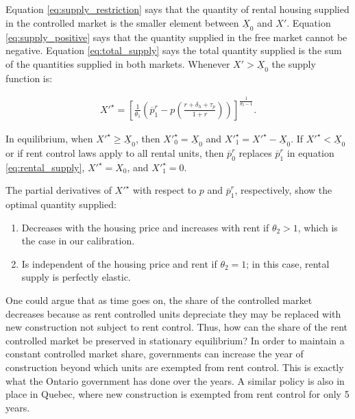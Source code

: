 \documentclass[parskip=full]{article}
\begin{document}
\noindent Equation \ref{eq:supply_restriction} says that the quantity of rental housing supplied in the controlled market is the smaller element between $\underline{X}_{0}$ and $X'$. Equation \ref{eq:supply_positive} says that the quantity supplied in the free market cannot be negative. Equation \ref{eq:total_supply} says the total quantity supplied is the sum of the quantities supplied in both markets. Whenever $X'>\underline{X}_{0}$ the supply function is:

\begin{align}\label{eq:rental_supply}
X'^{\star}=\left[\frac{1}{\theta_{1}}\left(\overline{p}^{r}_{1}-p\left(\frac{r+\delta_{h}+\tau_{p}}{1+r}\right)\right)\right]^{\frac{1}{\theta_{2}-1}}.
\end{align}

\noindent In equilibrium, when $X'^{\star}\geq \underline{X}_{0}$, then $X'^{\star}_{0}=\underline{X}_{0}$ and $X'^{\star}_{1}=X'^{\star}-\underline{X}_{0}$. If $X'^{\star}<\underline{X}_{0}$ or if rent control laws apply to all rental units, then $\overline{p}^{r}_{0}$ replaces $\overline{p}^{r}_{1}$ in equation \ref{eq:rental_supply}, $X'^{\star}=X_{0}$, and $X'^{\star}_{1}=0$. 

\noindent The partial derivatives of $X'^{\star}$ with respect to $p$ and $\overline{p}^{r}_{1}$, respectively, show the optimal quantity supplied:

\begin{enumerate}
    \item Decreases with the housing price and increases with rent if $\theta_{2}>1$, which is the case in our calibration.
    \item Is independent of the housing price and rent if $\theta_{2}=1$; in this case, rental supply is perfectly elastic.
\end{enumerate}

One could argue that as time goes on, the share of the controlled market decreases because as rent controlled units depreciate they may be replaced with new construction not subject to rent control. Thus, how can the share of the rent controlled market be preserved in stationary equilibrium? In order to maintain a constant controlled market share, governments can increase the year of construction beyond which units are exempted from rent control. This is exactly what the Ontario government has done over the years. A similar policy is also in place in Quebec, where new construction is exempted from rent control for only 5 years.
\end{document}

